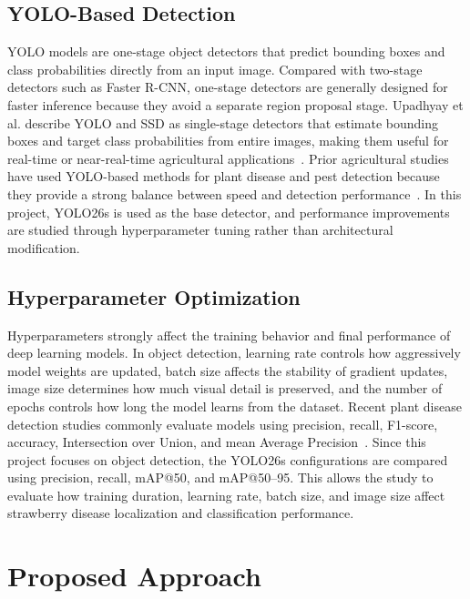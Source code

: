 \documentclass[10pt,twocolumn,letterpaper]{article}
\begin{document}
\subsection{YOLO-Based Detection}

YOLO models are one-stage object detectors that predict bounding boxes and class probabilities directly from an input image. Compared with two-stage detectors such as Faster R-CNN, one-stage detectors are generally designed for faster inference because they avoid a separate region proposal stage. Upadhyay et al. describe YOLO and SSD as single-stage detectors that estimate bounding boxes and target class probabilities from entire images, making them useful for real-time or near-real-time agricultural applications~\cite{upadhyay2025deep}. Prior agricultural studies have used YOLO-based methods for plant disease and pest detection because they provide a strong balance between speed and detection performance~\cite{upadhyay2025deep}. In this project, YOLO26s is used as the base detector, and performance improvements are studied through hyperparameter tuning rather than architectural modification.

\subsection{Hyperparameter Optimization}

Hyperparameters strongly affect the training behavior and final performance of deep learning models. In object detection, learning rate controls how aggressively model weights are updated, batch size affects the stability of gradient updates, image size determines how much visual detail is preserved, and the number of epochs controls how long the model learns from the dataset. Recent plant disease detection studies commonly evaluate models using precision, recall, F1-score, accuracy, Intersection over Union, and mean Average Precision~\cite{upadhyay2025deep}. Since this project focuses on object detection, the YOLO26s configurations are compared using precision, recall, mAP@50, and mAP@50--95. This allows the study to evaluate how training duration, learning rate, batch size, and image size affect strawberry disease localization and classification performance.

\section{Proposed Approach}
\label{sec:approach}
\end{document}
